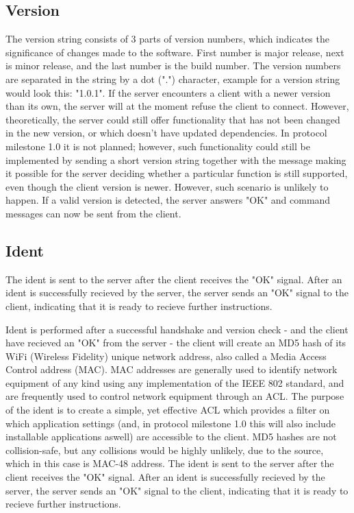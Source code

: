 \subsection{Version} 
The version string consists of 3 parts of version numbers, which indicates the significance of changes made to the software. First number is major release, next is minor release, and the last number is the build number. The version numbers are separated in the string by a dot (".") character, example for a version string would look this: "1.0.1". If the server encounters a client with a newer version than its own, the server will at the moment refuse the client to connect. However, theoretically, the server could still offer functionality that has not been changed in the new version, or which doesn't have updated dependencies. In protocol milestone 1.0 it is not planned; however, such functionality could still be implemented by sending a short version string together with the message making it possible for the server deciding whether a particular function is still supported, even though the client version is newer. However, such scenario is unlikely to happen. 
If a valid version is detected, the server answers "OK" and command messages can now be sent from the client.

\subsection{Ident}

The ident is sent to the server after the client receives the "OK" signal. After an ident is successfully recieved by the server, the server sends an "OK" signal to the client, indicating that it is ready to recieve further instructions. 

Ident is performed after a successful handshake and version check - and the client have recieved an "OK" from the server - the client will create an MD5 hash of its WiFi (Wireless Fidelity) unique network address, also called a Media Access Control address (MAC). MAC addresses are generally used to identify network equipment of any kind using any implementation of the IEEE 802 standard\cite{IEEE}, and are frequently used to control network equipment through an ACL\cite{cisco}. The purpose of the ident is to create a simple, yet effective ACL which provides a filter on which application settings (and, in protocol milestone 1.0 this will also include installable applications aswell) are accessible to the client. MD5 hashes are not collision-safe\cite{ACCESSDATA}, but any collisions would be highly unlikely, due to the source, which in this case is MAC-48 address. 
The ident is sent to the server after the client receives the "OK" signal. After an ident is successfully recieved by the server, the server sends an "OK" signal to the client, indicating that it is ready to recieve further instructions. 

